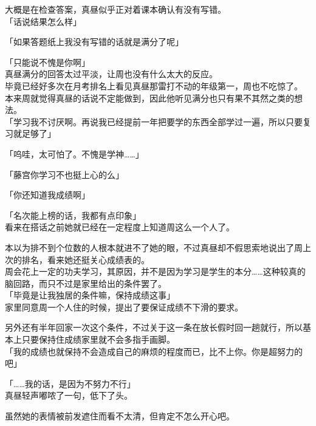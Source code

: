 大概是在检查答案，真昼似乎正对着课本确认有没有写错。\\

「话说结果怎么样」

「如果答题纸上我没有写错的话就是满分了呢」

「只能说不愧是你啊」\\

真昼满分的回答太过平淡，让周也没有什么太大的反应。\\

毕竟已经好多次在月考排名上看见真昼那雷打不动的年级第一，周也不吃惊了。\\

本来周就觉得真昼的话说不定能做到，因此他听见满分也只有果不其然之类的想法。\\

「学习我不讨厌啊。再说我已经提前一年把要学的东西全部学过一遍，所以只要复习就足够了」

「呜哇，太可怕了。不愧是学神……」%

「藤宫你学习不也挺上心的么」

「你还知道我成绩啊」

「名次能上榜的话，我都有点印象」\\

看来在搭话之前她就已经在一定程度上知道周这么一个人了。

本以为排不到个位数的人根本就进不了她的眼，不过真昼却不假思索地说出了周上次的排名，看来她还挺关心成绩表的。\\

周会花上一定的功夫学习，其原因，并不是因为学习是学生的本分……这种较真的脑回路，而只不过是家里给出的条件罢了。\\

「毕竟是让我独居的条件嘛，保持成绩这事」\\

家里同意周一个人住的时候，提出了要保证成绩不下滑的要求。

另外还有半年回家一次这个条件，不过关于这一条在放长假时回一趟就行，所以基本上只要保持住成绩家里就不会多指手画脚。\\

「我的成绩也就保持不会造成自己的麻烦的程度而已，比不上你。你是超努力的吧」

「……我的话，是因为不努力不行」\\

真昼轻声嘟哝了一句，低下了头。

虽然她的表情被前发遮住而看不太清，但肯定不怎么开心吧。\\

